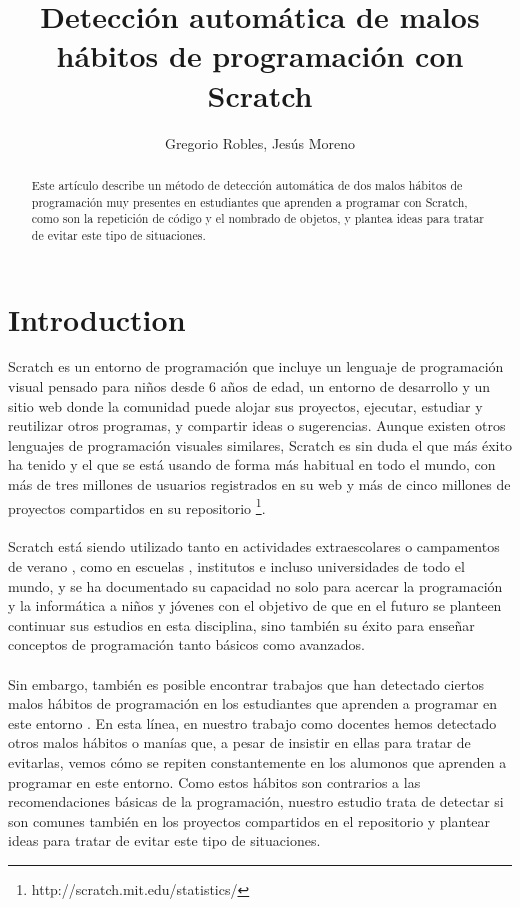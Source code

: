 \documentclass[a4paper,10pt]{article}
\title{Detección automática de malos hábitos de programación con Scratch}
\author{Gregorio Robles, Jesús Moreno}
\begin{document}
\maketitle

\begin{abstract}
Este artículo describe un método de detección automática de dos malos hábitos de programación muy presentes en estudiantes que aprenden a programar con Scratch, como son la repetición de código y el nombrado de objetos, y plantea ideas para tratar de
evitar este tipo de situaciones.

\end{abstract}

\section{Introduction}
Scratch \cite{resnick2009scratch} es un entorno de programación que incluye un lenguaje de programación visual pensado para niños desde 6 años de edad, un entorno de desarrollo y un sitio web donde la comunidad puede alojar sus proyectos, ejecutar, estudiar y reutilizar otros programas, y compartir ideas o sugerencias. Aunque existen otros lenguajes de programación visuales similares, Scratch es sin duda el que más éxito ha tenido y el que se está usando de forma más habitual en todo el mundo, con más de tres millones de usuarios registrados en su web y más de cinco millones de proyectos compartidos en su repositorio \footnote{http://scratch.mit.edu/statistics/}.
\paragraph{}Scratch está siendo utilizado tanto en actividades extraescolares \cite{maloney2008programming, kafai2010entering} o campamentos de verano \cite{adams2010scratching, franklin2013assessment}, como en escuelas \cite{wilson2012evaluation}, institutos \cite{meerbaum2013learning} e incluso universidades \cite{wolz2009starting, malan2007scratch} de todo el mundo, y se ha documentado su capacidad no solo para acercar la programación y la informática a niños y jóvenes con el objetivo de que en el futuro se planteen continuar sus estudios en esta disciplina, sino también su éxito para enseñar conceptos de programación tanto básicos como avanzados.
\paragraph{}Sin embargo, también es posible encontrar trabajos que han detectado ciertos malos hábitos de programación en los estudiantes que aprenden a programar en este entorno \cite{meerbaum2011habits}. En esta línea, en nuestro trabajo como docentes hemos detectado otros malos hábitos o manías que, a pesar de insistir en ellas para tratar de evitarlas, vemos cómo se repiten constantemente en los alumonos que aprenden a programar en este entorno. Como estos hábitos son contrarios a las recomendaciones básicas de la programación, nuestro estudio trata de detectar si son comunes también en los proyectos compartidos en el repositorio y plantear ideas para tratar de evitar este tipo de situaciones.
\end{document}
